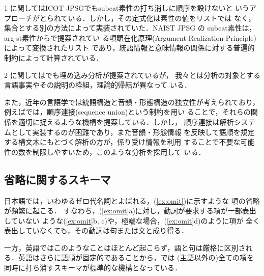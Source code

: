 1 に関してはICOT JPSGでも{\sc subcat}素性の打ち消しに順序を設けないと
いうアプローチがとられている．しかし，その定式化は素性の値をリストでは
なく，集合とする別の方法によって実装されていた．NAIST JPSG の{\sc
subcat}素性は，{\sc arg-st}素性からで提案されてい
る項顕在化原理(Argument Realization Principle)によって変換されたリスト
であり，統語情報と意味情報の関係に対する普遍的制約によって計算されている．

2 に関してはでも埋め込み分析が提案されているが，
我々とは分析の対象とする言語事実やその説明の枠組，理論的帰結が異なって
いる．

また，近年の言語学では統語構造と音韻・形態構造の独立性が考えられており，
例えばでは，順序連接(sequence union)という制約を用い
ることで，それらの関係を適切に捉えるような機構を提案している．しかし，
順序連接は解析システムとして実装するのが困難であり，また音韻・形態情報
を反映して語順を規定する構文木にもとづく解析の方が，係り受け情報を利用
することで不要な可能性の数を制限しやすいため，このような分析を採用して
いる．


\subsection{省略に関するスキーマ}\label{sec:jpsg:drop}

日本語では，いわゆるゼロ代名詞とよばれる，(\ref{ex:omit})に示すような
項の省略が頻繁に起こる．
すなわち，(\ref{ex:omit}a)に対し，動詞が要求する項が一部表出していない
ような(\ref{ex:omit}b, c)や，極端な場合，(\ref{ex:omit}d)のように項が
全く表出していなくても，その動詞は句または文と成り得る．

一方，英語ではこのようなことはほとんど起こらず，語と句は厳格に区別され
る．英語はさらに語順が固定的であることから，では
(主語以外の)全ての項を同時に打ち消すスキーマが標準的な機構となっている．

